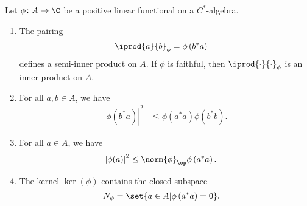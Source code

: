 \documentclass[10pt]{mypackage}
\begin{document}
\begin{proposition}
  Let $\phi\colon A\rightarrow \C$ be a positive linear functional on a $C^{\ast}$-algebra.
  \begin{enumerate}[(1)]
    \item The pairing
      \begin{align*}
        \iprod{a}{b}_{\phi} &= \phi\left(b^{\ast}a\right)
      \end{align*}
      defines a semi-inner product on $A$. If $\phi$ is faithful, then $ \iprod{\cdot}{\cdot}_{\phi} $ is an inner product on $A$.
    \item For all $a,b\in A$, we have
      \begin{align*}
        \left\vert \phi\left(b^{\ast}a\right) \right\vert^2 &\leq \phi\left(a^{\ast}a\right)\phi\left(b^{\ast}b\right).
      \end{align*}
    \item For all $a\in A$, we have
      \begin{align*}
        \left\vert \phi(a) \right\vert^2 &\leq \norm{\phi}_{\op}\phi\left(a^{\ast}a\right).
      \end{align*}
    \item The kernel $\ker\left(\phi\right)$ contains the closed subspace
      \begin{align*}
        N_{\phi} &= \set{a\in A | \phi\left(a^{\ast}a\right) = 0}.
      \end{align*}
  \end{enumerate}
\end{proposition}
\end{document}
